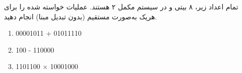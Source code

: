 

تمام اعداد زیر، ۸ بیتی و در سیستم مکمل ۲ هستند. عملیات خواسته شده را برای هریک به‌صورت مستقیم (بدون تبدیل مبنا) انجام دهید.

\begin{latin}
	\begin{enumerate}
			\item 
			00001011 + 01011110
			
			\item 
			100 - 110000
			
			\item 
			1101100 $\times$ 10001000
		\end{enumerate}
\end{latin}